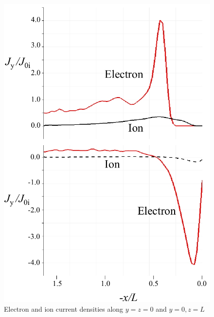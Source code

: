 \documentclass[draft,jgrga]{agutex2015}
\begin{document}
\begin{article}
\begin{figure}[t]
\centering
\noindent\includegraphics[width=12cm]{./figures/Fig_5_bb-crop.pdf}
\caption{Electron and ion current densities along $y=z=0$ and $y=0, z=L$ }\label{fig:5}
\end{figure}


\end{article}
\end{document}
